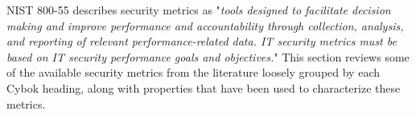 
NIST 800-55\cite{Swanson_Bartol_Sabato_Hash_Graffo_2003} describes security metrics as "\textit{tools designed to facilitate decision making and improve performance and accountability through collection, analysis, and reporting of relevant performance-related data. IT security metrics must be based on IT security performance goals and objectives.}" This section reviews some of the available security metrics from the literature loosely grouped by each Cybok heading, along with properties that have been used to characterize these metrics. 